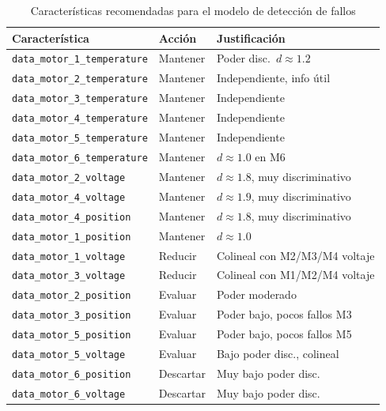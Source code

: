 \documentclass[12pt,a4paper]{article}
\begin{document}
\begin{table}[H]
\centering
\caption{Características recomendadas para el modelo de detección de fallos}
\begin{tabular}{@{}p{7cm}lp{4.5cm}@{}}
\toprule
\textbf{Característica} & \textbf{Acción} & \textbf{Justificación}\\
\midrule
\texttt{data\_motor\_1\_temperature} & Mantener & Poder disc.\ $d \approx 1.2$\\
\texttt{data\_motor\_2\_temperature} & Mantener & Independiente, info útil\\
\texttt{data\_motor\_3\_temperature} & Mantener & Independiente\\
\texttt{data\_motor\_4\_temperature} & Mantener & Independiente\\
\texttt{data\_motor\_5\_temperature} & Mantener & Independiente\\
\texttt{data\_motor\_6\_temperature} & Mantener & $d \approx 1.0$ en M6\\
\texttt{data\_motor\_2\_voltage}     & Mantener & $d \approx 1.8$, muy discriminativo\\
\texttt{data\_motor\_4\_voltage}     & Mantener & $d \approx 1.9$, muy discriminativo\\
\texttt{data\_motor\_4\_position}    & Mantener & $d \approx 1.8$, muy discriminativo\\
\texttt{data\_motor\_1\_position}    & Mantener & $d \approx 1.0$\\
\midrule
\texttt{data\_motor\_1\_voltage}     & Reducir  & Colineal con M2/M3/M4 voltaje\\
\texttt{data\_motor\_3\_voltage}     & Reducir  & Colineal con M1/M2/M4 voltaje\\
\texttt{data\_motor\_2\_position}    & Evaluar  & Poder moderado\\
\texttt{data\_motor\_3\_position}    & Evaluar  & Poder bajo, pocos fallos M3\\
\texttt{data\_motor\_5\_position}    & Evaluar  & Poder bajo, pocos fallos M5\\
\texttt{data\_motor\_5\_voltage}     & Evaluar  & Bajo poder disc., colineal\\
\texttt{data\_motor\_6\_position}    & Descartar & Muy bajo poder disc.\\
\texttt{data\_motor\_6\_voltage}     & Descartar & Muy bajo poder disc.\\
\bottomrule
\end{tabular}
\end{table}
\end{document}

